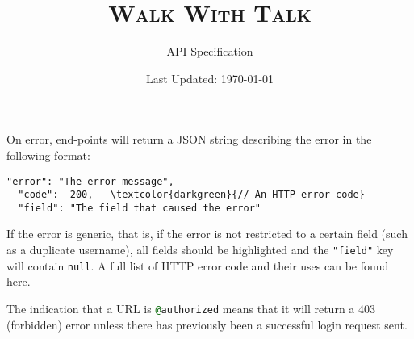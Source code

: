 \documentclass[fleqn,12pt]{article}
\title{\textsc{Walk With Talk}}
\author{API Specification}
\date{Last Updated: \today}
\makeatletter
\newcommand{\jsnull}{\texttt{null}}
\newcommand{\auth}{\texttt{\textcolor{darkgreen}{@}authorized}}
\makeatother
\begin{document}
\maketitle

\noindent
On error, end-points will return a JSON string describing the error in the
following format:
\begin{Verbatim}[commandchars=\\\{\}]
  "error": "The error message",
  "code":  200,   \textcolor{darkgreen}{// An HTTP error code}
  "field": "The field that caused the error"
\end{Verbatim}
\noindent
If the error is generic, that is, if the error is not restricted to a certain
field (such as a duplicate username), all fields should be highlighted and
the \texttt{"field"} key will contain \jsnull. A full list of HTTP error code
and their uses can be found
\href{https://en.wikipedia.org/wiki/List_of_HTTP_status_codes}{here}.

The indication that a URL is \auth{} means that it will return a 403 (forbidden)
error unless there has previously been a successful login request sent.
\end{document}
